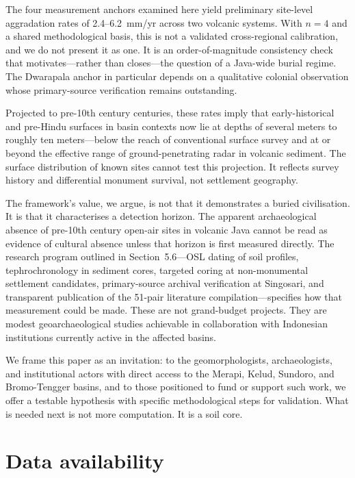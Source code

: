 \documentclass[12pt,a4paper]{article}
\begin{document}
The four measurement anchors examined here yield preliminary site-level aggradation rates of 2.4--6.2~mm/yr across two volcanic systems. With $n=4$ and a shared methodological basis, this is not a validated cross-regional calibration, and we do not present it as one. It is an order-of-magnitude consistency check that motivates---rather than closes---the question of a Java-wide burial regime. The Dwarapala anchor in particular depends on a qualitative colonial observation whose primary-source verification remains outstanding.

Projected to pre-10th century centuries, these rates imply that early-historical and pre-Hindu surfaces in basin contexts now lie at depths of several meters to roughly ten meters---below the reach of conventional surface survey and at or beyond the effective range of ground-penetrating radar in volcanic sediment. The surface distribution of known sites cannot test this projection. It reflects survey history and differential monument survival, not settlement geography.

The framework's value, we argue, is not that it demonstrates a buried civilisation. It is that it characterises a detection horizon. The apparent archaeological absence of pre-10th century open-air sites in volcanic Java cannot be read as evidence of cultural absence unless that horizon is first measured directly. The research program outlined in Section~5.6---OSL dating of soil profiles, tephrochronology in sediment cores, targeted coring at non-monumental settlement candidates, primary-source archival verification at Singosari, and transparent publication of the 51-pair literature compilation---specifies how that measurement could be made. These are not grand-budget projects. They are modest geoarchaeological studies achievable in collaboration with Indonesian institutions currently active in the affected basins.

We frame this paper as an invitation: to the geomorphologists, archaeologists, and institutional actors with direct access to the Merapi, Kelud, Sundoro, and Bromo-Tengger basins, and to those positioned to fund or support such work, we offer a testable hypothesis with specific methodological steps for validation. What is needed next is not more computation. It is a soil core.


\section*{Data availability}
\end{document}
